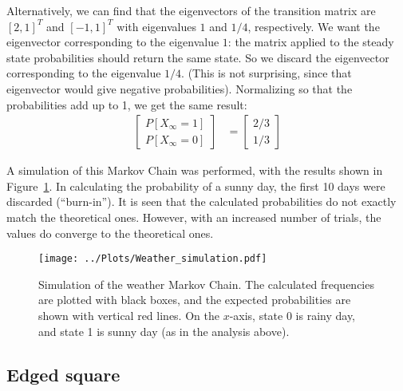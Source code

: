 \documentclass[twocolumn]{myarticle}
\newcommand{\mat}[1]{\begin{bmatrix}#1\end{bmatrix}}
\begin{document}
Alternatively, we can find that the eigenvectors of the transition matrix are $ [2,1]^T $ and $ [-1,1]^T $ with eigenvalues $ 1 $ and $ 1/4 $, respectively.
We want the eigenvector corresponding to the eigenvalue $ 1 $: the matrix applied to the steady state probabilities should return the same state.
So we discard the eigenvector corresponding to the eigenvalue $ 1/4 $.
(This is not surprising, since that eigenvector would give negative probabilities).
Normalizing so that the probabilities add up to 1, we get the same result:
\begin{align}
    \mat{P[X_\infty = 1] \\ P[X_\infty = 0]} &= \mat{2/3 \\ 1/3}
\end{align}

A simulation of this Markov Chain was performed, with the results shown in Figure~\ref{fig:weather_simulation}.
In calculating the probability of a sunny day, the first 10 days were discarded (``burn-in'').
It is seen that the calculated probabilities do not exactly match the theoretical ones.
However, with an increased number of trials, the values do converge to the theoretical ones.

\begin{figure}[ht!]
    \begin{center}
    \texttt{[image: ../Plots/Weather\_simulation.pdf]}
    \caption{%
        Simulation of the weather Markov Chain.
        The calculated frequencies are plotted with black boxes, and the expected probabilities are shown with vertical red lines.
        On the $ x $-axis, state 0 is rainy day, and state 1 is sunny day (as in the analysis above).
    }
    \label{fig:weather_simulation}
    \end{center}
\end{figure}

\subsection{Edged square}
\label{subsec:edged_square}
\end{document}

